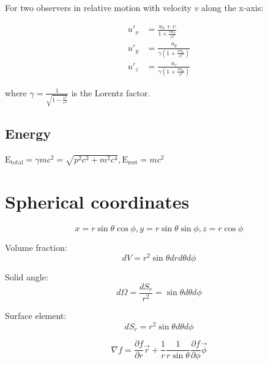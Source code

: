 \documentclass[12pt,a4paper]{article}
\begin{document}
	For two observers in relative motion with velocity \( v \) along the x-axis:
	
	\begin{align}
		u'_{x} &= \frac{u_{x} + v}{1 + \frac{vu_{x}}{c^2}} \\
		u'_{y} &= \frac{u_{y}}{\gamma(1 + \frac{vu_{x}}{c^2})} \\
		u'_{z} &= \frac{u_{z}}{\gamma(1 + \frac{vu_{x}}{c^2})}
	\end{align}
	
	where \( \gamma = \frac{1}{\sqrt{1 - \frac{v^2}{c^2}}} \) is the Lorentz factor.
	
	\subsection*{Energy}
	$\text{E}_\text{total} = \gamma mc^2 = \sqrt{p^2c^2 + m^2c^4}, \text{E}_\text{rest} = mc^2$
	
		
	\section*{Spherical coordinates}
	\[
		x = r \sin \theta \cos \phi,  y = r \sin \theta \sin \phi, z = r \cos \phi
	\]

	
	\vspace{.1in}
	Volume fraction: 
	\[ dV = r^2 \sin \theta dr d\theta d\phi \]
	
	\vspace{.1in}
	Solid angle: 
	\[ d\Omega = \frac{dS_r}{r^2} = \sin\theta d\theta d\phi \]
	
	\vspace{.1in}
	Surface element: 
	\[ dS_r = r^2 \sin\theta d\theta d\phi \]
	
	
	\begin{equation}
		\nabla f = \frac{\partial f}{\partial r} \vec{r} + \frac{1}{r} \frac{1}{r \sin \theta} \frac{\partial f}{\partial \phi} \vec{\phi}
	\end{equation}
	
\end{document}

